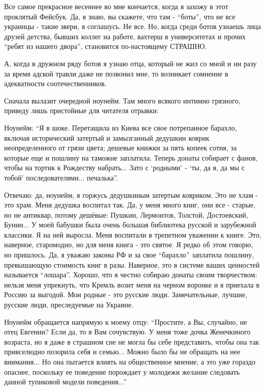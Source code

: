 Все самое прекрасное весеннее во мне кончается, когда я захожу в этот проклятый
Фейсбук. Да, я знаю, вы скажете, что там - \enquote{боты}, что не все украинцы - такие
звери, я соглашусь. Не все. Но, когда среди ботов узнаешь лица друзей детства,
бывших коллег на работе, вахтерш в университетах и прочих \enquote{ребят из нашего
двора},  становится по-настоящему СТРАШНО. 

А, когда в дружном ряду ботов я узнаю отца, который не жил со мной и ни разу за
время адской травли даже не позвонил мне, то возникает сомнение в адекватности
соотечественников. 

Сначала вылазит очередной ноунейм. Там много всякого интимно грязного, приведу
лишь пристойные для читателя отрывки:

Ноунейм: \enquote{Я в шоке. Перетащила из Киева все свое потрепанное барахло, включая
исторический затертый и замызганный дедушкин коврик неопределенного от грязи
цвета; дешевые книжки за пять копеек сотня, за которые еще и пошлину на таможне
заплатила. Теперь донаты собирает с фанов, чтобы на тортик к Рождеству
набрать... Зато с \enquote{родными} - \enquote{ты, да я, да мы с тобой} последователями...
печалька}.

Отвечаю: да, ноунейм, я горжусь дедушкиным затертым ковриком. Это не хлам - это
храм. Меня дедушка воспитал так. Да, у меня много книг, они все - старые, но не
антиквар, потому дешёвые: Пушкин, Лермонтов, Толстой, Достоевский, Бунин... У
моей бабушки была очень большая библиотека русской и зарубежной классики. Я на
ней выросла. Меня воспитали в трепетном уважении к книге. Это, наверное,
старомодно, но для меня книга - это святое. Я редко об этом говорю, но
пришлось. Да, я уважаю законы РФ и за свое \enquote{барахло} заплатила пошлину,
превышающую стоимость книг в разы. Наверное, это в системе ваших ценностей
называется \enquote{лошара}. Хорошо, что я честно собираю донаты своим творчеством:
нельзя меня упрекнуть, что Кремль возит меня на черном воронке и я приехала в
Россию за выгодой. Мои родные - это русские люди. Замечательные, лучшие,
русские люди, преследуемые на Украине.

Ноунейм обращается напрямую к моему отцу: \enquote{Простите, а Вы, случайно, не отец
Евгении? Если да, то я Вам сочувствую. У меня тоже дочка Женечкиного возраста,
но я даже в страшном сне не могла бы себе представить, чтобы она так
привселюдно позорила себя и семью... Можно было бы не обращать на нее
внимания... Но она пытается влиять на общественное мнение, а это уже гораздо
опаснее, поскольку ее поведение порождает у молодежи желание следовать данной
тупиковой модели поведения...}

